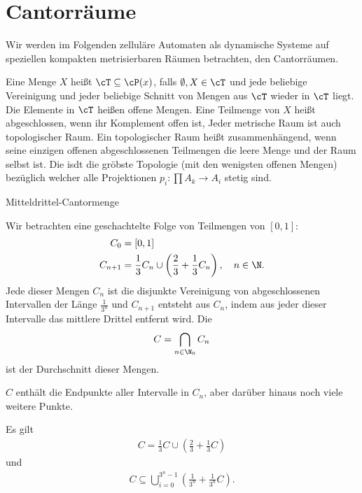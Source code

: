 \section{Cantorräume}
Wir werden im Folgenden zelluläre Automaten als dynamische Systeme auf speziellen kompakten metrisierbaren Räumen betrachten, den Cantorräumen.
\begin{erinnerung}
  Eine Menge $X$ heißt  $\cT \subseteq \cP(x)$, falls $\emptyset, X \in \cT$ und jede beliebige Vereinigung und jeder beliebige Schnitt von Mengen aus $\cT$ wieder in $\cT$ liegt. Die Elemente in $\cT$ heißen offene Mengen. Eine Teilmenge von $X$ heißt abgeschlossen, wenn ihr Komplement offen ist, Jeder metrische Raum ist auch topologischer Raum. Ein topologischer Raum heißt zusammenhängend, wenn seine einzigen offenen abgeschlossenen Teilmengen  die leere Menge und der Raum selbst ist. Die  isdt die gröbste Topologie (mit den wenigsten offenen Mengen) bezüglich welcher alle Projektionen $p_i: \prod A_k \to A_i$ stetig sind. 
\end{erinnerung}
\begin{definition} Mitteldrittel-Cantormenge

Wir betrachten eine geschachtelte Folge von Teilmengen von $[0, 1]$:
\begin{align*}
  C_0 &= [0,1]\\
  C_ {n+1}& = \frac 13 C_n \cup \left( \frac 2 3 + \frac 1 3 C_n\right), \quad n \in \N.
\end{align*}
 Jede dieser Mengen $C_n$ ist die disjunkte Vereinigung von abgeschlossenen Intervallen der Länge $\frac 1 {3^n}$ und $C_{n+1}$ entsteht aus $C_n$, indem aus jeder dieser Intervalle das mittlere Drittel entfernt wird. Die 
 \begin{align*}
   C = \bigcap_{n \in \N_0} C_n
 \end{align*}
ist der Durchschnitt dieser Mengen.
\end{definition}
$C$ enthält die Endpunkte aller Intervalle in $C_n$, aber darüber hinaus noch viele weitere Punkte. 
\begin{uebung}
  Es gilt
  \begin{align*}
    C = \frac 1 3C \cup \left( \frac 2 3 + \frac 1 3 C\right)
  \end{align*}
und 
\begin{align*}
  C \subseteq \bigcup_{i = 0}^{3^n-1}\left( \frac 1 {3^n} + \frac 1{3^n}C\right).
\end{align*}
\end{uebung}
